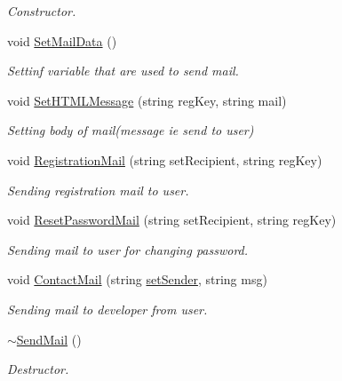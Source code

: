 \begin{DoxyCompactItemize}
\begin{DoxyCompactList}\small\item\em Constructor. \end{DoxyCompactList}\item 
void \hyperlink{classSendMail_a25ba5afabc97cf3dab525f2eb1e67e0e}{Set\-Mail\-Data} ()
\begin{DoxyCompactList}\small\item\em Settinf variable that are used to send mail. \end{DoxyCompactList}\item 
void \hyperlink{classSendMail_a89c5a5bace5c21014b8184db5707b986}{Set\-H\-T\-M\-L\-Message} (string reg\-Key, string mail)
\begin{DoxyCompactList}\small\item\em Setting body of mail(message ie send to user) \end{DoxyCompactList}\item 
void \hyperlink{classSendMail_a4c9983852dbcd1eb07170582761ed559}{Registration\-Mail} (string set\-Recipient, string reg\-Key)
\begin{DoxyCompactList}\small\item\em Sending registration mail to user. \end{DoxyCompactList}\item 
void \hyperlink{classSendMail_a56180b5a27efd4d43514f91008b280ef}{Reset\-Password\-Mail} (string set\-Recipient, string reg\-Key)
\begin{DoxyCompactList}\small\item\em Sending mail to user for changing password. \end{DoxyCompactList}\item 
void \hyperlink{classSendMail_a3d918a3f54b3a9be68fe732e9d5de43f}{Contact\-Mail} (string \hyperlink{classSendMail_ae6776dfd1b92b97837f25259f7b57d2f}{set\-Sender}, string msg)
\begin{DoxyCompactList}\small\item\em Sending mail to developer from user. \end{DoxyCompactList}\item 
\hypertarget{classSendMail_acc86b2a9995472436dbd77b3c6bb91f3}{\hyperlink{classSendMail_acc86b2a9995472436dbd77b3c6bb91f3}{$\sim$\-Send\-Mail} ()}\label{classSendMail_acc86b2a9995472436dbd77b3c6bb91f3}

\begin{DoxyCompactList}\small\item\em Destructor. \end{DoxyCompactList}\end{DoxyCompactItemize}
